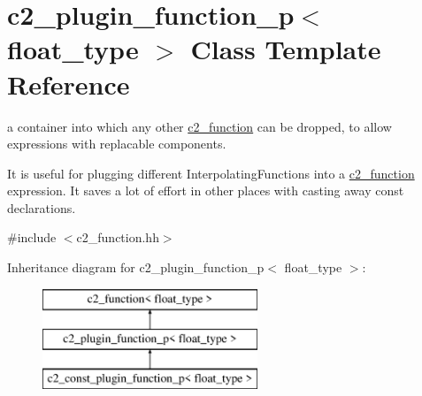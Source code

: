 \hypertarget{classc2__plugin__function__p}{\section{c2\-\_\-plugin\-\_\-function\-\_\-p$<$ float\-\_\-type $>$ Class Template Reference}
\label{classc2__plugin__function__p}
}


a container into which any other \hyperlink{classc2__function}{c2\-\_\-function} can be dropped, to allow expressions with replacable components.

It is useful for plugging different Interpolating\-Functions into a \hyperlink{classc2__function}{c2\-\_\-function} expression. It saves a lot of effort in other places with casting away const declarations.  




{\ttfamily \#include $<$c2\-\_\-function.\-hh$>$}

Inheritance diagram for c2\-\_\-plugin\-\_\-function\-\_\-p$<$ float\-\_\-type $>$\-:\begin{figure}[H]
\begin{center}
\leavevmode
\includegraphics[height=3.000000cm]{classc2__plugin__function__p}
\end{center}
\end{figure}
